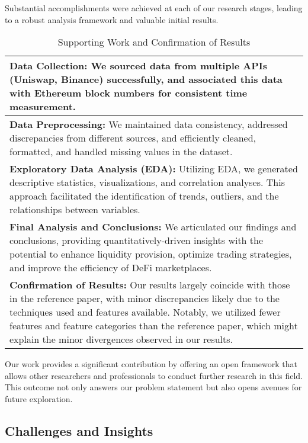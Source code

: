 \documentclass{article}
\begin{document}
  Substantial accomplishments were achieved at each of our research stages, leading to a robust analysis framework and valuable initial results\cite{Miori2023}.

  \begin{table}[htbp]
  \centering
  \small
  \begin{tabularx}{\linewidth}{|>{\raggedright\arraybackslash}X|}
  \hline
  \textbf{Data Collection:} We sourced data from multiple APIs (Uniswap, Binance) successfully, and associated this data with Ethereum block numbers for consistent time measurement. \\
  \hline
  \textbf{Data Preprocessing:} We maintained data consistency, addressed discrepancies from different sources, and efficiently cleaned, formatted, and handled missing values in the dataset. \\
  \hline
  \textbf{Exploratory Data Analysis (EDA):} Utilizing EDA, we generated descriptive statistics, visualizations, and correlation analyses. This approach facilitated the identification of trends, outliers, and the relationships between variables. \\
  \hline
  \textbf{Final Analysis and Conclusions:} We articulated our findings and conclusions, providing quantitatively-driven insights with the potential to enhance liquidity provision, optimize trading strategies, and improve the efficiency of DeFi marketplaces. \\
  \hline
  \textbf{Confirmation of Results:} Our results largely coincide with those in the reference paper, with minor discrepancies likely due to the techniques used and features available. Notably, we utilized fewer features and feature categories than the reference paper, which might explain the minor divergences observed in our results\cite{Miori2023}. \\
  \hline
  \end{tabularx}
  \caption{Supporting Work and Confirmation of Results}
  \label{fig:approach-accomplishments}
  \end{table}

Our work provides a significant contribution by offering an open framework that allows other researchers and professionals to conduct further research in this field. This outcome not only answers our problem statement but also opens avenues for future exploration\cite{Miori2022}.

\subsection{\textbf{Challenges and Insights}}
\end{document}
